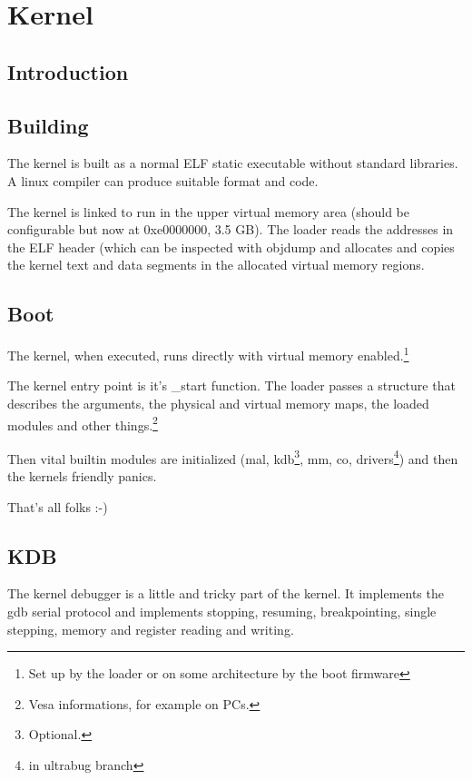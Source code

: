 \chapter{Kernel}

\section{Introduction}

\section{Building}

The kernel is built as a normal ELF static executable without standard libraries. 
A linux compiler can produce suitable format and code. 

The kernel is linked to run in the upper virtual memory area (should be configurable
but now at 0xe0000000, 3.5 GB). The loader reads the addresses in the ELF header (which can be inspected with \textsf{objdump} and allocates and copies the kernel text and data segments in the allocated
virtual memory regions. 


\section{Boot}

The kernel, when executed, runs directly with virtual memory enabled.\footnote{Set up by the loader
or on some architecture by the boot firmware}

The kernel entry point is it's \textsf{\_start} function.
The loader passes a structure that describes the arguments, the physical and virtual memory
maps, the loaded modules and other things.\footnote{Vesa informations, for example on PCs.}

Then vital builtin modules are initialized (\textsf{mal}, 
\textsf{kdb}\footnote{Optional.}, \textsf{mm}, \textsf{co}, \textsf{drivers}\footnote{in \textsf{ultrabug branch}}) and then the kernels friendly panics.

That's all folks :-)

\section{KDB}

The kernel debugger is a little and tricky part of the kernel. It implements the \textsf{gdb}
serial protocol and implements stopping, resuming, breakpointing, single stepping, memory and register reading and writing.

